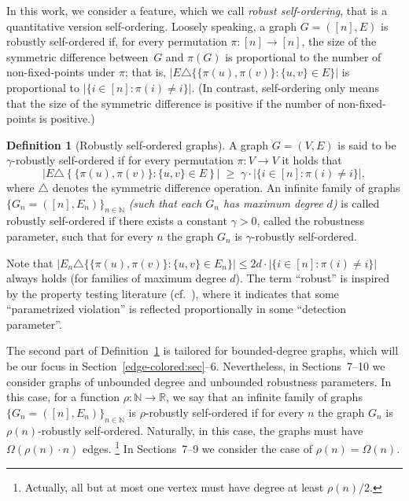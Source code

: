 \documentclass[10pt,a4paper]{article}
\theoremstyle{definition}
\newtheorem{definition}[theorem]{Definition}
\newcommand{\N}{\mathbb N}
\newcommand{\R}{\mathbb R}
\newcommand{\BD}{\begin{definition}}   \newcommand{\ED}{\end{definition}}
\begin{document}
In this work, we consider a feature,
which we call {\em robust self-ordering},
that is a quantitative version self-ordering.
%
Loosely speaking, a graph $G=([n],E)$ is robustly self-ordered if,
%
%
for every permutation $\pi:[n]\to[n]$,
the size of the symmetric difference between~$G$ and $\pi(G)$
is proportional to the number of non-fixed-points under $\pi$;
that is, $|E\triangle\{\{\pi(u),\pi(v)\}\!:\!\{u,v\}\!\in\!E\}|$
is proportional to $|\{i\!\in\![n]\!:\!\pi(i)\!\neq\!i\}|$.
(In contrast, self-ordering only means that
the size of the symmetric difference is positive
if the number of non-fixed-points is positive.)

%
\BD[Robustly self-ordered graphs]
\label{robust-asymmetric:def}
A graph $G=(V,E)$ is said to be {\sf $\gamma$-robustly self-ordered}
if for every permutation $\pi:V\to{V}$
it holds that
\begin{equation}\label{robust-asymmetric:eqdef}
\big|E\triangle\left\{\{\pi(u),\pi(v)\}\!:\!\{u,v\}\!\in\!E\right\}\big|
  \;\geq\; \gamma\cdot|\{i\in[n]\!:\!\pi(i)\neq i\}|,
\end{equation}
where $\triangle$ denotes the symmetric difference operation.
An infinite family of graphs $\{G_n=([n],E_n)\}_{n\in\N}$
{\em(such that each $G_n$ has maximum degree $d$)}
is called {\sf robustly self-ordered}
if there exists a constant $\gamma>0$, called the {\sf robustness parameter},
such that for every $n$ the graph $G_n$ is $\gamma$-robustly self-ordered.
\ED
Note that
$|E_n\triangle\{\{\pi(u),\pi(v)\}\!:\!\{u,v\}\!\in\!E_n\}|
 \leq 2d\cdot|\{i\in[n]\!:\!\pi(i)\neq i\}|$
always holds (for families of maximum degree $d$).
%
%
%
%
%
The term ``robust'' is inspired by
the property testing literature (cf.~\cite{RS}),
where it indicates that some ``parametrized violation''
is reflected proportionally in some ``detection parameter''.

The second part of Definition~\ref{robust-asymmetric:def}
is tailored for bounded-degree graphs, which will be our focus
in Section~\ref{edge-colored:sec}--6.
Nevertheless,
in Sections~7--10
we consider graphs
of unbounded degree and unbounded robustness parameters.
In this case, for a function $\rho:\N\to\R$,
we say that an infinite family of graphs $\{G_n=([n],E_n)\}_{n\in\N}$
is {\sf $\rho$-robustly self-ordered} if for every $n$
the graph $G_n$ is $\rho(n)$-robustly self-ordered.
Naturally, in this case, the graphs
must have $\Omega(\rho(n)\cdot n)$ edges.
\footnote{Actually, all but at most one vertex
must have degree at least $\rho(n)/2$.}
%
In Sections~7--9
we consider the case of $\rho(n)=\Omega(n)$.
\end{document}
